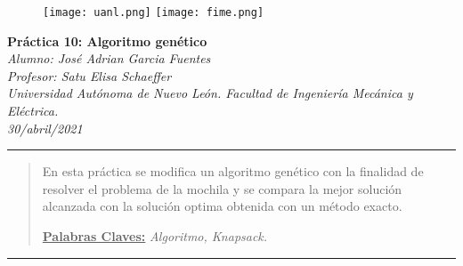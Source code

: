 \documentclass[10pt,a4paper]{article}
\author{Jorge Vicente Niño Mocarro}
\begin{document}
	
	\begin{figure}[H]
		\raggedright
		\texttt{[image: uanl.png]} \hfill \texttt{[image: fime.png]}
	\end{figure}

	\vspace{6mm}
	
	\begin{center}
		{\Large \textbf{Práctica 10: Algoritmo genético}}\\
		\vspace{2mm}
		\textit{ Alumno: José Adrian Garcia Fuentes}\\
		\textit{Profesor: Satu Elisa Schaeffer}\\
		\vspace{2.5mm}
		\textit{Universidad Autónoma de Nuevo León. Facultad de Ingeniería Mecánica y Eléctrica.}\\
		\vspace{1mm}
		\textit {30/abril/2021 }
		
		
	\end{center}

	\begin{center}
		\textcolor{azul}{\rule{150mm}{0.8mm}}
	\end{center}

	\begin{abstract}
		En esta práctica se modifica un algoritmo genético con la finalidad de resolver el problema de la mochila y se compara la mejor solución alcanzada con la solución optima obtenida con un método exacto.
		\vspace{2mm}\par
		\underline{\textbf{Palabras Claves:}} \hspace{2mm} \textit{Algoritmo, Knapsack.}
	\end{abstract}
	
	\begin{center}
		\textcolor{azul}{\rule{150mm}{0.8mm}}
	\end{center}
	
	\vspace{5mm}
\end{document}
